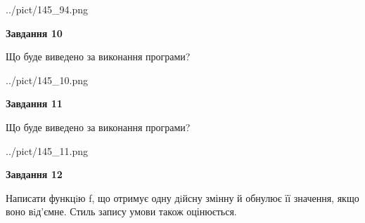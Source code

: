 \documentclass[12pt, ukrainian]{article}
\begin{document}
{\begin {large}
\begin{center}
	{../pict/145_94.png}
\end{center}
\newpage

{\begin {center}\textbf{Завдання 10}\end {center}}

Що буде виведено за виконання програми?\par
\begin{center}
	{../pict/145_10.png}
\end{center}
\newpage

{\begin {center}\textbf{Завдання 11}\end {center}}

Що буде виведено за виконання програми?\par
\begin{center}
	{../pict/145_11.png}
\end{center}
\newpage

{\begin {center}\textbf{Завдання 12}\end {center}}


Написати функцiю f, що отримує одну дiйсну змінну й обнулює її значення, якщо воно вiд'ємне. Стиль запису умови також оцінюється.\par
\newpage

\end {large}}
\end{document}
